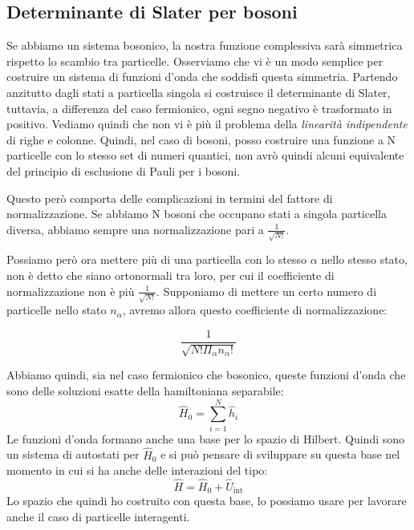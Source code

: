 \subsection{Determinante di Slater per bosoni}
Se abbiamo un sistema bosonico, la nostra funzione complessiva sarà simmetrica rispetto lo scambio tra particelle. Osserviamo che vi è un modo semplice per costruire un sistema di funzioni d'onda che soddisfi questa simmetria. Partendo anzitutto dagli stati a particella singola si costruisce il determinante di Slater, tuttavia, a differenza del caso fermionico, ogni segno negativo è trasformato in positivo. Vediamo quindi che non vi è più il problema della \textit{linearità indipendente} di righe e colonne. Quindi, nel caso di bosoni, posso costruire una funzione a N particelle con lo stesso set di numeri quantici, non avrò quindi alcuni equivalente del principio di esclusione di Pauli per i bosoni.

Questo però comporta delle complicazioni in termini del fattore di normalizzazione. Se abbiamo N bosoni che occupano stati a singola particella diversa, abbiamo sempre una normalizzazione pari a $\frac{1}{\sqrt{N!}}$.

Possiamo però ora mettere più di una particella con lo stesso $\alpha$ nello stesso stato, non è detto che siano ortonormali tra loro, per cui il coefficiente di normalizzazione non è più $\frac{1}{\sqrt{N!}}$. Supponiamo di mettere un certo numero di particelle nello stato $n_\alpha$, avremo allora questo coefficiente di normalizzazione:

\begin{equation*}
    \frac{1}{\sqrt{N!\Pi_\alpha n_\alpha!}}
\end{equation*}

Abbiamo quindi, sia nel caso fermionico che bosonico, queste funzioni d'onda che sono delle soluzioni esatte della hamiltoniana separabile:
\begin{equation*}
    \hat H_0 = \sum_{i=1}^N \hat h_i
\end{equation*}
Le funzioni d'onda formano anche una base per lo spazio di Hilbert. Quindi sono un sistema di autostati per $\hat H_0$ e si può pensare di sviluppare su questa base nel momento in cui si ha anche delle interazioni del tipo:
\begin{equation*}
    \hat H = \hat H_0 + \hat U_{\text{int}}
\end{equation*}
Lo spazio che quindi ho costruito con questa base, lo possiamo usare per lavorare anche il caso di particelle interagenti.

